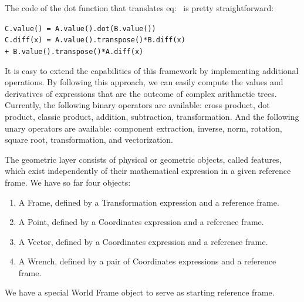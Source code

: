 
The code of the dot function that translates eq:~ is pretty straightforward:
\begin{center}
{\tt C.value() = A.value().dot(B.value())\\
C.diff(x) = A.value().transpose()*B.diff(x) \\ + B.value().transpose()*A.diff(x)}
\end{center}

It is easy to extend the capabilities of this framework by implementing additional operations.
By following this approach, we can easily compute the values and derivatives of expressions that are the outcome of complex arithmetic trees.
Currently, the following binary operators are available: cross product, dot product, classic product, addition, subtraction, transformation.
And the following unary operators are available: component extraction, inverse, norm, rotation, square root, transformation, and vectorization.

The geometric layer consists of physical or geometric objects, called features, which exist independently of their mathematical expression in a given reference frame.
We have so far four objects:
\begin{enumerate}
  \item A Frame, defined by a Transformation expression and a reference frame.
  \item A Point, defined by a Coordinates expression and a reference frame.
  \item A Vector, defined by a Coordinates expression and a reference frame.
  \item A Wrench, defined by a pair of Coordinates expressions and a reference frame.
\end{enumerate}
We have a special World Frame object to serve as starting reference frame.

